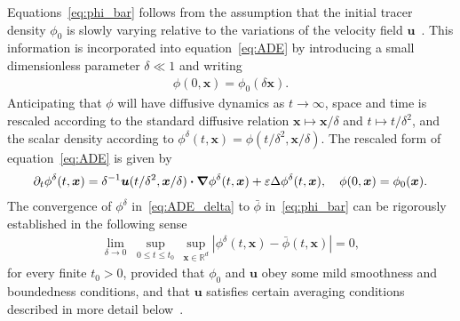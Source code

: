 \documentclass[leqno,onefignum,onetabnum]{siamltex1213}
\newcommand\bnabla{\mbox{\boldmath${\nabla}$}}
\providecommand\bcdot{\boldsymbol{\cdot}}
\newcommand{\vecx}{\boldsymbol{x}}
\newcommand{\vecu}{\boldsymbol{u}}
\begin{document}
Equations~\eqref{eq:phi_bar}
follows from the assumption that the
initial tracer density $\phi_0$ is 
slowly varying relative to the variations of the velocity field
$\vecu$~\cite{McLaughlin:SIAM_JAM:780,Fannjiang:1997:1033,Majda:Kramer:1999:book}.
This information is incorporated into equation~\eqref{eq:ADE} by
introducing a small dimensionless parameter $\delta\ll1$ and
writing~\cite{McLaughlin:SIAM_JAM:780,Fannjiang:1997:1033,Majda:Kramer:1999:book}      
%
\begin{align}
  \phi(0,\vecx)=\phi_0(\delta\vecx). 
\end{align}
%
Anticipating that $\phi$ will have diffusive dynamics as $t\to\infty$, space and 
time is rescaled according to the standard diffusive relation
$\vecx\mapsto\vecx/\delta$ and $t\mapsto t/\delta^2$, and the scalar density according to
$\phi^\delta(t,\vecx)=\phi(t/\delta^2,\vecx/\delta)$. The rescaled form of
equation~\eqref{eq:ADE} is given by~\cite{Majda:Kramer:1999:book}
%
\begin{align}\label{eq:ADE_delta}
  \partial_t\phi^\delta(t,\vecx)=\delta^{-1}\vecu(t/\delta^2,\vecx/\delta)\bcdot\bnabla\phi^\delta(t,\vecx)
              +\varepsilon\Delta\phi^\delta(t,\vecx),
              \quad
             \phi(0,\vecx)=\phi_0(\vecx). 
\end{align}
%
The convergence of $\phi^\delta$ in~\eqref{eq:ADE_delta} to $\bar{\phi}$
in~\eqref{eq:phi_bar} can be rigorously established in the following
sense   
%
\begin{align}\label{eq:Homogenization_Theorem}
  \lim_{\delta\to0}\;\sup_{0\leq t\leq t_0}\,\sup_{\vecx\in\mathbb{R}^d}
  |\phi^\delta(t,\vecx)-\bar{\phi}(t,\vecx)| =0,
\end{align}
%
for every finite $t_0>0$, provided that $\phi_0$ and $\vecu$ obey some
mild smoothness and boundedness
conditions, and that $\vecu$ satisfies certain averaging conditions
described in more detail below~\cite{Majda:Kramer:1999:book}.
\end{document}
